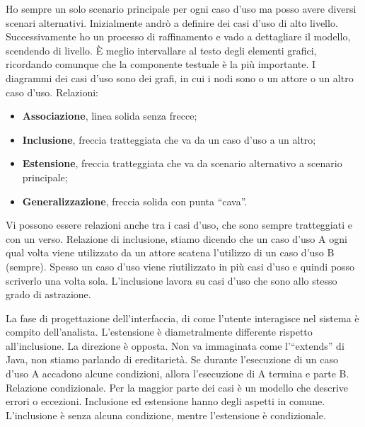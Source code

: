 Ho sempre un solo scenario principale per ogni caso d'uso ma posso avere diversi scenari alternativi. Inizialmente andrò a definire dei casi d'uso di alto livello. Successivamente ho un processo di raffinamento e vado a dettagliare il modello, scendendo di livello. È meglio intervallare al testo degli elementi grafici, ricordando comunque che la componente testuale è la più importante. I diagrammi dei casi d'uso sono dei grafi, in cui i nodi sono o un attore o un altro caso d'uso.
Relazioni:

\begin{itemize}
\item \textbf{Associazione}, linea solida senza frecce;
\item \textbf{Inclusione}, freccia tratteggiata che va da un caso d'uso a un altro;
\item \textbf{Estensione}, freccia tratteggiata che va da scenario alternativo a scenario principale;
\item \textbf{Generalizzazione}, freccia solida con punta “cava”.
\end{itemize}

Vi possono essere relazioni anche tra i casi d'uso, che sono sempre tratteggiati e con un verso. Relazione di inclusione, stiamo dicendo che un caso d'uso A ogni qual volta viene utilizzato da un attore scatena l'utilizzo di un caso d'uso B (sempre). Spesso un caso d'uso viene riutilizzato in più casi d'uso e quindi posso scriverlo una volta sola. L'inclusione lavora su casi d'uso che sono allo stesso grado di astrazione.
 
La fase di progettazione dell'interfaccia, di come l'utente interagisce nel sistema è compito dell'analista. L'estensione è diametralmente differente rispetto all'inclusione. La direzione è opposta. Non va immaginata come l'``extends'' di Java, non stiamo parlando di ereditarietà. Se durante l'esecuzione di un caso d'uso A accadono alcune condizioni, allora l'esecuzione di A termina e parte B. Relazione condizionale. Per la maggior parte dei casi è un modello che descrive errori o eccezioni.
Inclusione ed estensione hanno degli aspetti in comune. L'inclusione è senza alcuna condizione, mentre l'estensione è condizionale.

